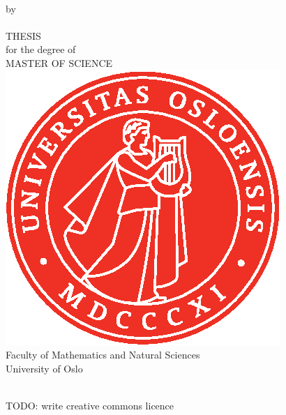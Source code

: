 \thispagestyle{empty}
\begin{center} \vspace{1cm}
    \textbf{\Large{\mtitle}}\\ \vspace{0.5cm}
    \small{by}\\ \vspace{0.5cm}
    \large{\mauthor}\\ \vspace{4.4cm}
    \large{THESIS}\\ \vspace{0.3cm}
    \small{for the degree of}\\ \vspace{0.3cm}
    \large{MASTER OF SCIENCE}\\ \vspace{0.7cm}
    \includegraphics[scale=1.0]{text/UiO_Segl_pms485.eps} \\ \vspace{0.5cm}
    \large{Faculty of Mathematics and Natural Sciences \\ University of Oslo} \\ \vspace{0.5cm}
    \small{\mdate}\\ \vfill
\end{center}

\thispagestyle{empty}
\clearpage
TODO: write creative commons licence
\thispagestyle{empty}
\clearpage

